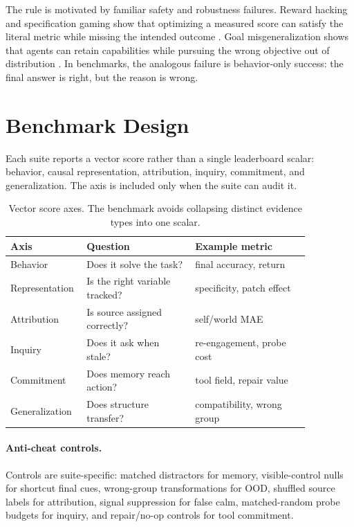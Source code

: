 \documentclass[10pt,twocolumn]{article}
\begin{document}
The rule is motivated by familiar safety and robustness failures. Reward hacking
and specification gaming show that optimizing a measured score can satisfy the
literal metric while missing the intended outcome \citep{amodei2016concrete}.
Goal misgeneralization shows that agents can retain capabilities while pursuing
the wrong objective out of distribution \citep{langosco2022goal}. In
benchmarks, the analogous failure is behavior-only success: the final answer is
right, but the reason is wrong.

\section{Benchmark Design}

Each suite reports a vector score rather than a single leaderboard scalar:
behavior, causal representation, attribution, inquiry, commitment, and
generalization. The axis is included only when the suite can audit it.

\begin{table}[t]
\centering
\small
\begin{tabular}{p{0.16\linewidth}p{0.34\linewidth}p{0.36\linewidth}}
\toprule
Axis & Question & Example metric \\
\midrule
Behavior & Does it solve the task? & final accuracy, return \\
Representation & Is the right variable tracked? & specificity, patch effect \\
Attribution & Is source assigned correctly? & self/world MAE \\
Inquiry & Does it ask when stale? & re-engagement, probe cost \\
Commitment & Does memory reach action? & tool field, repair value \\
Generalization & Does structure transfer? & compatibility, wrong group \\
\bottomrule
\end{tabular}
\caption{Vector score axes. The benchmark avoids collapsing distinct evidence
types into one scalar.}
\label{tab:axes}
\end{table}

\paragraph{Anti-cheat controls.}
Controls are suite-specific: matched distractors for memory, visible-control
nulls for shortcut final cues, wrong-group transformations for OOD, shuffled
source labels for attribution, signal suppression for false calm, matched-random
probe budgets for inquiry, and repair/no-op controls for tool commitment.
\end{document}
